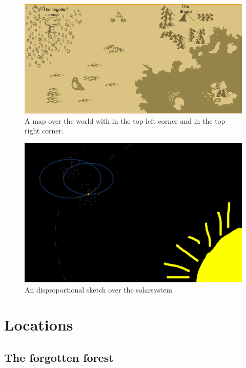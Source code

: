 \documentclass{article}
\begin{document}
\begin{figure}[h!]
\centering
\includegraphics[width=150mm]{world.png}
\caption*{A map over the world with  in the top left corner and  in the top right corner.}
\end{figure}
\begin{figure}[h!]
\centering
\includegraphics[width=150mm]{World+.png}
\caption*{An disproportional sketch over the solarsystem}
\end{figure}

\section{Locations}%












\subsection{The forgotten forest}
\label{forest1}
\end{document}
